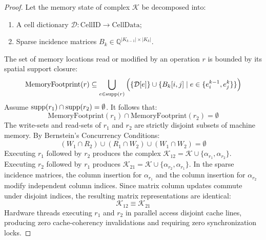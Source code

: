 \begin{proof}
Let the memory state of complex $\mathcal{K}$ be decomposed into:
\begin{enumerate}
    \item A cell dictionary $\mathcal{D} : \text{CellID} \to \text{CellData}$;
    \item Sparse incidence matrices $B_k \in \mathbb{Q}^{|K_{k-1}| \times |K_k|}$.
\end{enumerate}
The set of memory locations read or modified by an operation $r$ is bounded by its spatial support closure:
\begin{equation}
    \text{MemoryFootprint}(r) \subseteq \bigcup_{e \in \operatorname{supp}(r)} \Big( \{ \mathcal{D}[e] \} \cup \{ B_k[i, j] \mid e \in \{e_i^{k-1}, e_j^k\} \} \Big)
\end{equation}
Assume $\operatorname{supp}(r_1) \cap \operatorname{supp}(r_2) = \emptyset$. It follows that:
\begin{equation}
    \text{MemoryFootprint}(r_1) \cap \text{MemoryFootprint}(r_2) = \emptyset
\end{equation}
The write-sets and read-sets of $r_1$ and $r_2$ are strictly disjoint subsets of machine memory. By Bernstein's Concurrency Conditions:
\begin{equation}
    (W_1 \cap R_2) \cup (R_1 \cap W_2) \cup (W_1 \cap W_2) = \emptyset
\end{equation}
Executing $r_1$ followed by $r_2$ produces the complex $\mathcal{K}_{12} = \mathcal{K} \cup \{\alpha_{r_1}, \alpha_{r_2}\}$. Executing $r_2$ followed by $r_1$ produces $\mathcal{K}_{21} = \mathcal{K} \cup \{\alpha_{r_2}, \alpha_{r_1}\}$. In the sparse incidence matrices, the column insertion for $\alpha_{r_1}$ and the column insertion for $\alpha_{r_2}$ modify independent column indices. Since matrix column updates commute under disjoint indices, the resulting matrix representations are identical:
\begin{equation}
    \mathcal{K}_{12} \equiv \mathcal{K}_{21}
\end{equation}
Hardware threads executing $r_1$ and $r_2$ in parallel access disjoint cache lines, producing zero cache-coherency invalidations and requiring zero synchronization locks.
\end{proof}

